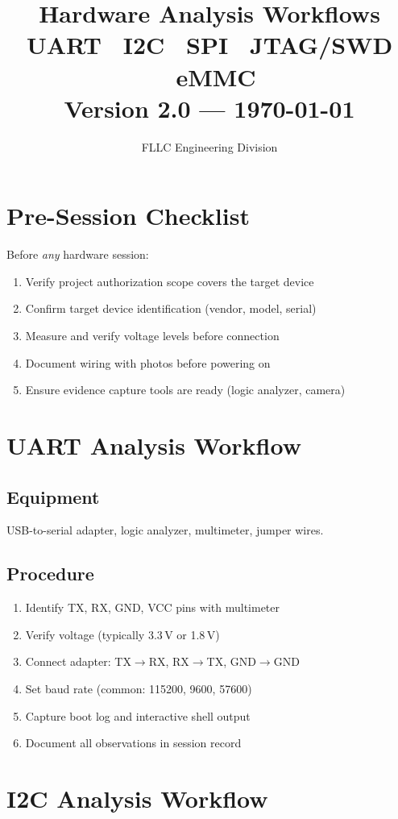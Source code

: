 \documentclass[11pt,a4paper]{article}
\title{%
  {\Huge\bfseries\textcolor{cyber}{Hardware Analysis Workflows}}\\[6pt]
  {\Large UART \textbullet\ I2C \textbullet\ SPI \textbullet\ JTAG/SWD \textbullet\ eMMC}\\[4pt]
  {\normalsize Version 2.0 --- \today}
}
\author{FLLC Engineering Division}
\date{}
\begin{document}
\maketitle\thispagestyle{fancy}
\tableofcontents\newpage

\section{Pre-Session Checklist}
Before \emph{any} hardware session:
\begin{enumerate}
  \item Verify project authorization scope covers the target device
  \item Confirm target device identification (vendor, model, serial)
  \item Measure and verify voltage levels before connection
  \item Document wiring with photos before powering on
  \item Ensure evidence capture tools are ready (logic analyzer, camera)
\end{enumerate}

\section{UART Analysis Workflow}
\subsection{Equipment}
USB-to-serial adapter, logic analyzer, multimeter, jumper wires.
\subsection{Procedure}
\begin{enumerate}
  \item Identify TX, RX, GND, VCC pins with multimeter
  \item Verify voltage (typically 3.3\,V or 1.8\,V)
  \item Connect adapter: TX$\to$RX, RX$\to$TX, GND$\to$GND
  \item Set baud rate (common: 115200, 9600, 57600)
  \item Capture boot log and interactive shell output
  \item Document all observations in session record
\end{enumerate}

\section{I2C Analysis Workflow}
\end{document}
